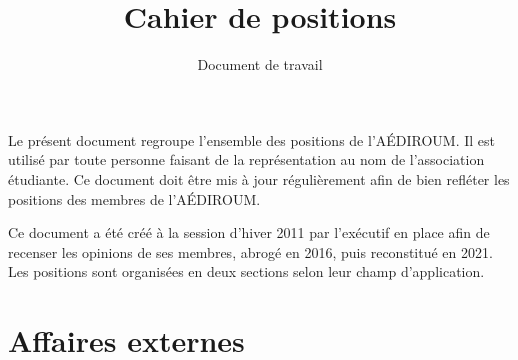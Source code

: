 \documentclass{aediroum}
\title{Cahier de positions}
\date{Document de travail}
\begin{document}
\maketitle

Le présent document regroupe l'ensemble des positions de l'AÉDIROUM. Il est utilisé par toute personne faisant de la représentation au nom de l'association étudiante. Ce document doit être mis à jour régulièrement afin de bien refléter les positions des membres de l'AÉDIROUM.

Ce document a été créé à la session d'hiver 2011 par l'exécutif en place afin de recenser les opinions de ses membres, abrogé en 2016, puis reconstitué en 2021. Les positions sont organisées en deux sections selon leur champ d'application.

\section{Affaires externes}\label{sec:affaires-externes}
\end{document}
